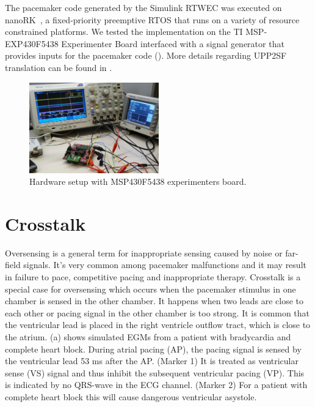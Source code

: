 The pacemaker code generated by the Simulink RTWEC was executed on nanoRK~\cite{nanork}, a fixed-priority preemptive RTOS that runs on a variety of resource constrained platforms. We tested the implementation on the TI MSP-EXP430F5438 Experimenter Board interfaced with a signal generator that provides inputs for the pacemaker code (). More details regarding UPP2SF translation can be found in \cite{TECS}.

\begin{figure} [!t]
\center
\includegraphics[width=0.5\textwidth]{figs/HW_setup1.png}
\caption{Hardware setup with MSP430F5438 experimenters board.}
\label{fig:setup}
\end{figure}

\section{Crosstalk}
Oversensing is a general term for inappropriate sensing caused by noise or far-field signals. It's very common among pacemaker malfunctions and it may result in failure to pace, competitive pacing and inappropriate therapy. Crosstalk is a special case for oversensing which occurs when the pacemaker stimulus in one chamber is sensed in the other chamber. It happens when two leads are close to each other or pacing signal in the other chamber is too strong. It is common that the ventricular lead is placed in the right ventricle outflow tract, which is close to the atrium. (a) shows simulated EGMs from a patient with bradycardia and complete heart block. During atrial pacing (AP), the pacing signal is sensed by the ventricular lead 53 ms after the AP. (Marker 1) It is treated as ventricular sense (VS) signal and thus inhibit the subsequent ventricular pacing (VP). This is indicated by no QRS-wave in the ECG channel. (Marker 2) For a patient with complete heart block this will cause dangerous ventricular asystole.  

